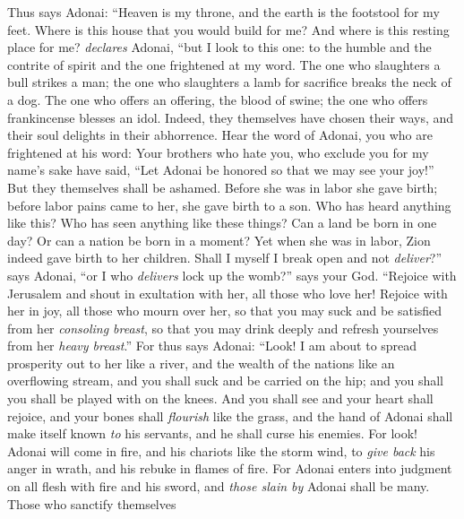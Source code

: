\begin{biblechapter} %
 Thus says Adonai:
\verse “Heaven is my throne, 
and the earth is the footstool for my feet. 
Where is this house that you would build for me? 
And where is this resting place for me? \textit{declares} Adonai, “but I look to this one:
\verse to the humble and the contrite of spirit 
and the one frightened at my word.
\verse The one who slaughters a bull strikes a man; 
the one who slaughters a lamb for sacrifice breaks the neck of a dog. 
The one who offers an offering, the blood of swine; 
the one who offers frankincense blesses an idol. 
Indeed, they themselves have chosen their ways, 
and their soul delights in their abhorrence.
\verse Hear the word of Adonai, you who are frightened at his word:
\verse Your brothers who hate you, 
who exclude you for my name’s sake have said, 
“Let Adonai be honored so that we may see your joy!” 
But they themselves shall be ashamed.
 Before she was in labor she gave birth; 
before labor pains came to her, she gave birth to a son.
\verse Who has heard anything like this? 
Who has seen anything like these things? 
Can a land be born in one day? 
Or can a nation be born in a moment? Yet when she was in labor, Zion indeed gave birth to her children.
\verse Shall I myself I break open and not \textit{deliver}?” says Adonai, 
“or I who \textit{delivers} lock up the womb?” says your God.
\verse “Rejoice with Jerusalem 
and shout in exultation with her, all those who love her! 
Rejoice with her in joy, all those who mourn over her,
\verse so that you may suck and be satisfied from her \textit{consoling breast}, 
so that you may drink deeply and refresh yourselves from her \textit{heavy breast}.”
\verse For thus says Adonai:
\verse “Look! I am about to spread prosperity out to her like a river, 
and the wealth of the nations like an overflowing stream, 
and you shall suck and be carried on the hip; 
and you shall you shall be played with on the knees.
 And you shall see and your heart shall rejoice, 
and your bones shall \textit{flourish} like the grass, 
and the hand of Adonai shall make itself known \textit{to} his servants, 
and he shall curse his enemies.
\verse For look! Adonai will come in fire, 
and his chariots like the storm wind, 
to \textit{give back} his anger in wrath, 
and his rebuke in flames of fire.
\verse For Adonai enters into judgment on all flesh with fire and his sword, 
and \textit{those slain by} Adonai shall be many.
\verse Those who sanctify themselves 

\end{biblechapter}
